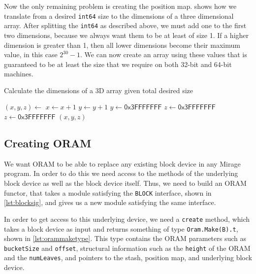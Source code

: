 \documentclass[12pt,a4paper,twoside,openright]{report}
\begin{document}
Now the only remaining problem is creating the position map.  shows how we translate from a desired \texttt{int64} size to the dimensions of a three dimensional array. After splitting the \texttt{int64} as described above, we must add one to the first two dimensions, because we always want them to be at least of size 1. If a higher dimension is greater than 1, then all lower dimensions become their maximum value, in this case $2^{30}-1$. We can now create an array using these values that is guaranteed to be at least the size that we require on both 32-bit and 64-bit machines.

\begin{algorithm}
\caption{Calculate the dimensions of a 3D array given total desired size}
\label{alg:posmapdims}
\begin{algorithmic}[1]
\vskip 10pt
\vskip 10pt
\vskip 10pt
	\State $(x, y, z) \gets$ 
\vskip 10pt
	\State $x \gets x + 1$
	\State $y \gets y + 1$
\vskip 10pt
		\State $y \gets \mathsf{0x3FFFFFFF}$
		\State $z \gets \mathsf{0x3FFFFFFF}$
		\State $z \gets \mathsf{0x3FFFFFFF}$
	\EndIf
\vskip 10pt
	\State \Return $(x,y,z)$
\vskip 10pt
\EndFunction
\vskip 10pt
\end{algorithmic}
\end{algorithm}

\subsection{Creating ORAM}

We want ORAM to be able to replace any existing block device in any Mirage program. In order to do this we need access to the methods of the underlying block device as well as the block device itself. Thus, we need to build an ORAM functor, that takes a module satisfying the \texttt{BLOCK} interface, shown in \cref{lst:blocksig}, and gives us a new module satisfying the same interface.

In order to get access to this underlying device, we need a \texttt{create} method, which takes a block device as input and returns something of type \texttt{Oram.Make(B).t}, shown in \cref{lst:orammaketype}. This type contains the ORAM parameters such as \texttt{bucketSize} and \texttt{offset}, structural information such as the \texttt{height} of the ORAM and the \texttt{numLeaves}, and pointers to the stash, position map, and underlying block device.
\end{document}
